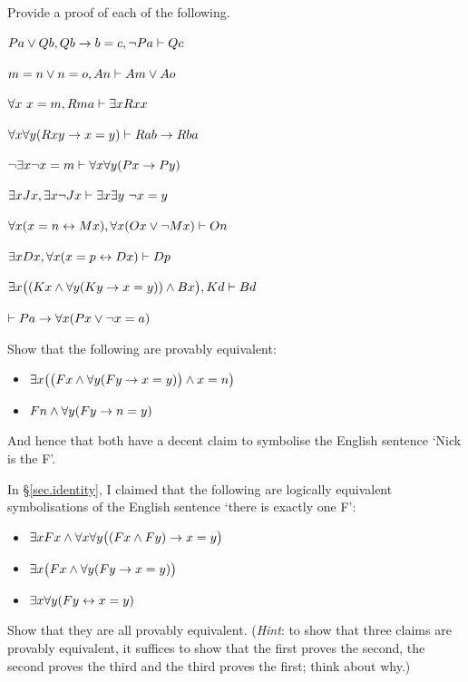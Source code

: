 \newpage
\practiceproblems
\problempart
\label{pr.identity}
Provide a proof of each of the following.
\begin{earg}
\item $Pa \vee Qb, Qb \rightarrow b=c, \neg Pa \vdash Qc$
\item $m=n \vee n=o, An \vdash Am \vee Ao$
\item $\forall x\ x=m, Rma\vdash \exists x Rxx$
\item $\forall x\forall y(Rxy \rightarrow x=y)\vdash Rab \rightarrow Rba$
\item $\neg \exists x\neg x = m \vdash \forall x\forall y (Px \rightarrow Py)$
\item $\exists x Jx, \exists x \neg Jx\vdash \exists x \exists y\ \neg x = y$
\item $\forall x(x=n \leftrightarrow Mx), \forall x(Ox \vee \neg Mx)\vdash On$
\item $\exists x Dx, \forall x(x=p \leftrightarrow Dx)\vdash Dp$
\item $\exists x\bigl( (Kx \wedge \forall y(Ky \rightarrow x=y)) \wedge Bx\bigr), Kd\vdash Bd$
\item $\vdash Pa \rightarrow \forall x(Px \vee \neg x = a)$
\end{earg}

\problempart
Show that the following are provably equivalent:
\begin{itemize}
\item $\exists x \bigl(\bigl(Fx \wedge \forall y (Fy \rightarrow x = y) \bigr) \wedge x = n\bigr)$
\item $Fn \wedge \forall y (Fy \rightarrow n= y)$
\end{itemize}
And hence that both have a decent claim to symbolise the English sentence `Nick is the F'.



\problempart
In §\ref{sec.identity}, I claimed that the following are logically equivalent symbolisations of the English sentence `there is exactly one F':
\begin{itemize}
\item $\exists x Fx \wedge \forall x \forall y \bigl( (Fx \wedge Fy) \rightarrow x = y\bigr)$
\item $\exists x \bigl(Fx \wedge \forall y (Fy \rightarrow x = y) \bigr)$
\item $\exists x \forall y (Fy \leftrightarrow x = y)$
\end{itemize}
Show that they are all provably equivalent. (\emph{Hint}: to show that three claims are provably equivalent, it suffices to show that the first proves the second, the second proves the third and the third proves the first; think about why.)




